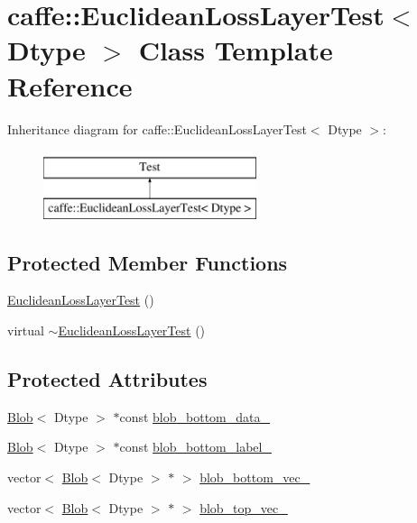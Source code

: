 \hypertarget{classcaffe_1_1_euclidean_loss_layer_test}{\section{caffe\+:\+:Euclidean\+Loss\+Layer\+Test$<$ Dtype $>$ Class Template Reference}
\label{classcaffe_1_1_euclidean_loss_layer_test}
}
Inheritance diagram for caffe\+:\+:Euclidean\+Loss\+Layer\+Test$<$ Dtype $>$\+:\begin{figure}[H]
\begin{center}
\leavevmode
\includegraphics[height=2.000000cm]{classcaffe_1_1_euclidean_loss_layer_test}
\end{center}
\end{figure}
\subsection*{Protected Member Functions}
\begin{DoxyCompactItemize}
\item 
\hyperlink{classcaffe_1_1_euclidean_loss_layer_test_a40a2a4d9ec95bba4b2bbd65a02f2784a}{Euclidean\+Loss\+Layer\+Test} ()
\item 
virtual \hyperlink{classcaffe_1_1_euclidean_loss_layer_test_aec948651fe388f06646ad36e57a85317}{$\sim$\+Euclidean\+Loss\+Layer\+Test} ()
\end{DoxyCompactItemize}
\subsection*{Protected Attributes}
\begin{DoxyCompactItemize}
\item 
\hyperlink{classcaffe_1_1_blob}{Blob}$<$ Dtype $>$ $\ast$const \hyperlink{classcaffe_1_1_euclidean_loss_layer_test_aa502435549ee6a7597a60f66aaecc4ea}{blob\+\_\+bottom\+\_\+data\+\_\+}
\item 
\hyperlink{classcaffe_1_1_blob}{Blob}$<$ Dtype $>$ $\ast$const \hyperlink{classcaffe_1_1_euclidean_loss_layer_test_ae2509956f3d64e647a9e704c428189ae}{blob\+\_\+bottom\+\_\+label\+\_\+}
\item 
vector$<$ \hyperlink{classcaffe_1_1_blob}{Blob}$<$ Dtype $>$ $\ast$ $>$ \hyperlink{classcaffe_1_1_euclidean_loss_layer_test_ace037a9615b21b31c469aee9fcdf76ae}{blob\+\_\+bottom\+\_\+vec\+\_\+}
\item 
vector$<$ \hyperlink{classcaffe_1_1_blob}{Blob}$<$ Dtype $>$ $\ast$ $>$ \hyperlink{classcaffe_1_1_euclidean_loss_layer_test_a0613ceccb5843e4c6880d4f348d73519}{blob\+\_\+top\+\_\+vec\+\_\+}
\end{DoxyCompactItemize}


